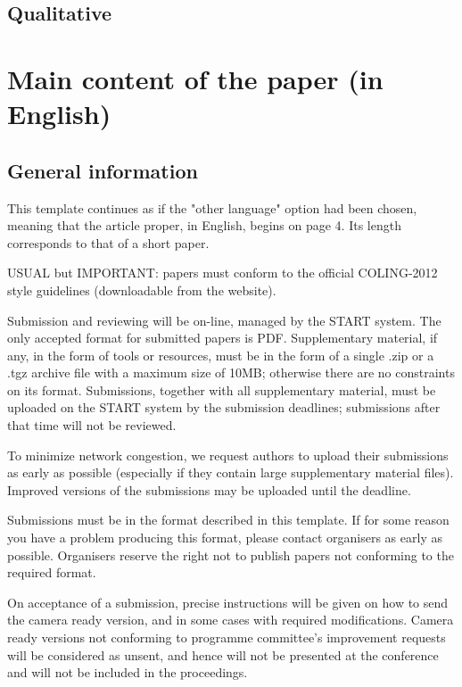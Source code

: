 \documentclass[10pt,a5paper,twoside]{article}
\begin{document}
\subsection{Qualitative}

\section{Main content of the paper (in English)}
\subsection{General information}
This template continues as if the "other language" option had been chosen, meaning that the article proper, in English, begins on page 4. Its length corresponds to that of a short paper.

USUAL but IMPORTANT: papers must conform to the official COLING-2012 style guidelines (downloadable from the website).

Submission and reviewing will be on-line, managed by the START system. The only accepted format for submitted papers is PDF. Supplementary material, if any, in the form of tools or resources, must be in the form of a single .zip or a .tgz archive file with a maximum size of 10MB; otherwise there are no constraints on its format. Submissions, together with all supplementary material, must be uploaded on the START system by the submission deadlines; submissions after that time will not be reviewed.

To minimize network congestion, we request authors to upload their submissions as early as possible (especially if they contain large supplementary material files). Improved versions of the submissions may be uploaded until the deadline.

Submissions must be in the format described in this template. If for some reason you have a problem producing this format, please contact organisers as early as possible. Organisers reserve the right not to publish papers not conforming to the required format.

On acceptance of a submission, precise instructions will be given on how to send the camera ready version, and in some cases with required modifications. Camera ready versions not conforming to programme committee’s improvement requests will be considered as unsent, and hence will not be presented at the conference and will not be included in the proceedings.
\end{document}
